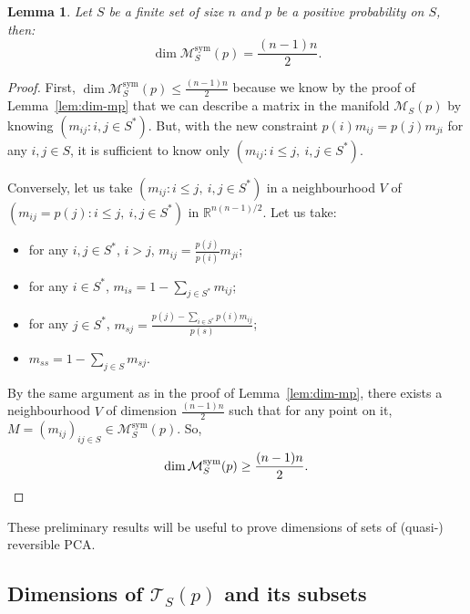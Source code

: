 \documentclass[10pt]{amsart}
\newtheorem{lemm}[theo]{Lemma}\newtheorem{prop}[theo]{Proposition}\newtheorem{coro}[theo]{Corollary}\newtheorem{conj}[theo]{Conjecture}
\theoremstyle{definition}\newtheorem{defi}[theo]{Definition}\newtheorem{rema}[theo]{Remark}\newtheorem{exam}[theo]{Example}\newtheorem{exem}[theo]{Example}\newtheorem{nota}[theo]{Notation}
\newcounter{a}
\newcommand{\triang}[2]{\mathcal{T}_{#1} \left(#2 \right)}
\DeclareMathOperator{\sym}{sym}
\begin{document}
\begin{lemm}\label{lem:div-sym}
Let $S$ be a finite set of size $n$ and $p$ be a positive probability on $S$, then:
\[
\dim \mathcal{M}^{\sym}_S(p) = \frac{(n-1)n}{2}.
\]
\end{lemm}

\begin{proof}
First, $\dim \mathcal{M}^{\sym}_S(p) \leq \frac{(n-1)n}{2}$ because we know by the proof of Lemma~\ref{lem:dim-mp} that we can describe a matrix in the manifold $\mathcal{M}_S(p)$ by knowing $(m_{ij} : i,j \in S^*)$. But, with the new constraint $p(i) m_{ij} = p(j) m_{ji}$ for any $i,j \in S$, it is sufficient to know only $(m_{ij} : i \leq j,\ i,j \in S^*)$.

Conversely, let us take $(m_{ij} : i \leq j,\ i,j \in S^*)$ in a neighbourhood $V$ of \linebreak$(m_{ij}= p(j) : i \leq j,\ i,j \in S^*)$ in $\mathbb{R}^{n(n-1)/2}$. Let us take:
\begin{itemize}
\item for any $i,j \in S^*$, $i>j$, $m_{ij} =  \frac{p(j)}{p(i)} m_{ji}$;
\item for any $i \in S^*$, $m_{is} = 1 - \sum_{j\in S^*} m_{ij}$;
\item for any $j \in S^*$, $m_{sj} =  \frac{p(j) - \sum_{i \in S^*} p(i) m_{ij}}{p(s)}$;
\item $m_{ss} = 1 - \sum_{j \in S} m_{sj}$.
\end{itemize}
By the same argument as in the proof of Lemma~\ref{lem:dim-mp}, there exists a neighbourhood $V$ of dimension $\frac{(n-1)n}{2}$ such that for any point on it, $M = (m_{ij})_{ij\in S} \in \mathcal{M}^{\sym}_S(p)$. So,
\[
\dim \mathcal{M}^{\sym}_S(p) \geq \frac{(n-1)n}{2}. \qedhere
\]
\end{proof}

These preliminary results will be useful to prove dimensions of sets of (quasi-) reversible PCA.

\subsection{Dimensions of \texorpdfstring{$\triang{S}{p}$}{triangSp} and its subsets}
\end{document}
